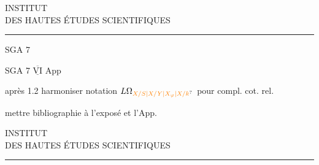 \begin{center}
INSTITUT\\
DES HAUTES ÉTUDES SCIENTIFIQUES\\[-.3ex]
\rule{1.3cm}{.4pt}
\end{center}

{\reversemarginpar{}}

\begin{flushright}
SGA 7
\end{flushright}

SGA 7 $\underline{\overline{\mathrm{VI}}}$ App

après 1.2 harmoniser notation $L\Omega_{\unsure{X/S|X/Y|X_{\varphi}|X/k}}$ pour compl. cot. rel.

mettre bibliographie  à l'exposé et l'App.

\begin{center}
INSTITUT\\
DES HAUTES ÉTUDES SCIENTIFIQUES\\[-.3ex]
\rule{1.3cm}{.4pt}
\end{center}




